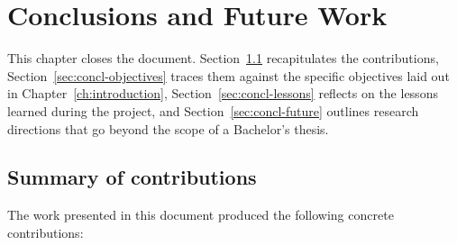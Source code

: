 
\chapter{Conclusions and Future Work}\label{ch:conclusions}

This chapter closes the document. Section~\ref{sec:concl-contributions} recapitulates the
contributions, Section~\ref{sec:concl-objectives} traces them against the specific objectives
laid out in Chapter~\ref{ch:introduction}, Section~\ref{sec:concl-lessons} reflects on the
lessons learned during the project, and Section~\ref{sec:concl-future} outlines research
directions that go beyond the scope of a Bachelor's thesis.

\section{Summary of contributions}\label{sec:concl-contributions}

The work presented in this document produced the following concrete contributions:

